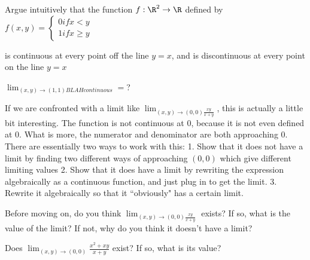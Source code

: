 	\begin{question}
		Argue intuitively that the function $f:\R^2 \to \R$ defined by 
			$f(x,y) = \begin{cases}
			0 if x<y\\
			1 if x\geq y
			\end{cases}$
			
			is continuous at every point off the line $y=x$, and is discontinuous at every point on the line $y=x$
	\end{question}
	
	\begin{question}
		$\lim_{(x,y) \to (1,1) BLAHcontinuous} = $?
	\end{question}
	
	If we are confronted with a limit like $\lim_{(x,y) \to (0,0) \frac{xy}{x+y}}$, this is actually a little bit interesting.  The function is not continuous at $0$, because it is
	not even defined at $0$.  What is more, the numerator and denominator are both approaching $0$.  There are essentially two ways to work with this: 
	1. Show that it does not have a limit by finding two different ways of approaching $(0,0)$ which give different limiting values
	2. Show that it does have a limit by rewriting the expression algebraically as a continuous function, and just plug in to get the limit.
	3.  Rewrite it algebraically so that it ``obviously" has a certain limit.
	
	\begin{question}
		Before moving on, do you think $\lim_{(x,y) \to (0,0) \frac{xy}{x+y}}$ exists?  If so, what is the value of the limit?  If not, why do you think it doesn't have a limit?
	\end{question}
	
	\begin{question}
		Does $\lim_{(x,y) \to (0,0)} \frac{x^2+xy}{x+y}$ exist?  If so, what  is its value?
	\end{question}
	
	
